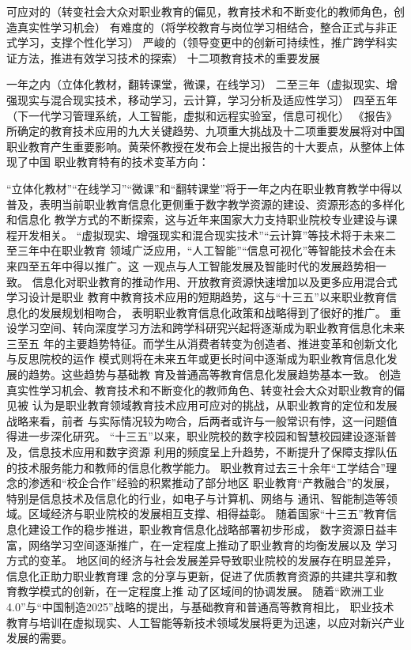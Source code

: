 \documentclass[11pt]{ctexart}
\begin{document}
{{{{可应对的（转变社会大众对职业教育的偏见，教育技术和不断变化的教师角色，创造真实性学习机会）
有难度的（将学校教育与岗位学习相结合，整合正式与非正式学习，支撑个性化学习）
严峻的（领导变更中的创新可持续性，推广跨学科实证方法，推进有效学习技术的探索）
十二项教育技术的重要发展

一年之内（立体化教材，翻转课堂，微课，在线学习）
二至三年（虚拟现实、增强现实与混合现实技术，移动学习，云计算，学习分析及适应性学习）
四至五年（下一代学习管理系统，人工智能，虚拟和远程实验室，信息可视化）
《报告》所确定的教育技术应用的九大关键趋势、九项重大挑战及十二项重要发展将对中国
职业教育产生重要影响。黄荣怀教授在发布会上提出报告的十大要点，从整体上体现了中国
职业教育特有的技术变革方向：

“立体化教材”“在线学习”“微课”和“翻转课堂”将于一年之内在职业教育教学中得以
普及，表明当前职业教育信息化更侧重于数字教学资源的建设、资源形态的多样化和信息化
教学方式的不断探索，这与近年来国家大力支持职业院校专业建设与课程开发相关。
“虚拟现实、增强现实和混合现实技术”“云计算”等技术将于未来二至三年中在职业教育
领域广泛应用，“人工智能”“信息可视化”等智能技术会在未来四至五年中得以推广。这
一观点与人工智能发展及智能时代的发展趋势相一致。
信息化对职业教育的推动作用、开放教育资源快速增加以及更多应用混合式学习设计是职业
教育中教育技术应用的短期趋势，这与“十三五”以来职业教育信息化的发展规划相吻合，
表明职业教育信息化政策和战略得到了很好的推广。
重设学习空间、转向深度学习方法和跨学科研究兴起将逐渐成为职业教育信息化未来三至五
年的主要趋势特征。而学生从消费者转变为创造者、推进变革和创新文化与反思院校的运作
模式则将在未来五年或更长时间中逐渐成为职业教育信息化发展的趋势。这些趋势与基础教
育及普通高等教育信息化发展趋势基本一致。
创造真实性学习机会、教育技术和不断变化的教师角色、转变社会大众对职业教育的偏见被
认为是职业教育领域教育技术应用可应对的挑战，从职业教育的定位和发展战略来看，前者
与实际情况较为吻合，后两者或许与一般常识有悖，这一问题值得进一步深化研究。
“十三五”以来，职业院校的数字校园和智慧校园建设逐渐普及，信息技术应用和数字资源
利用的频度呈上升趋势，不断提升了保障支撑队伍的技术服务能力和教师的信息化教学能力。
职业教育过去三十余年“工学结合”理念的渗透和“校企合作”经验的积累推动了部分地区
职业教育“产教融合”的发展，特别是信息技术及信息化的行业，如电子与计算机、网络与
通讯、智能制造等领域。区域经济与职业院校的发展相互支撑、相得益彰。
随着国家“十三五”教育信息化建设工作的稳步推进，职业教育信息化战略部署初步形成，
数字资源日益丰富，网络学习空间逐渐推广，在一定程度上推动了职业教育的均衡发展以及
学习方式的变革。
地区间的经济与社会发展差异导致职业院校的发展存在明显差异，信息化正助力职业教育理
念的分享与更新，促进了优质教育资源的共建共享和教育教学模式的创新，在一定程度上推
动了区域间的协调发展。
随着“欧洲工业4.0”与“中国制造2025”战略的提出，与基础教育和普通高等教育相比，
职业技术教育与培训在虚拟现实、人工智能等新技术领域发展将更为迅速，以应对新兴产业
发展的需要。

}}}}
\end{document}
